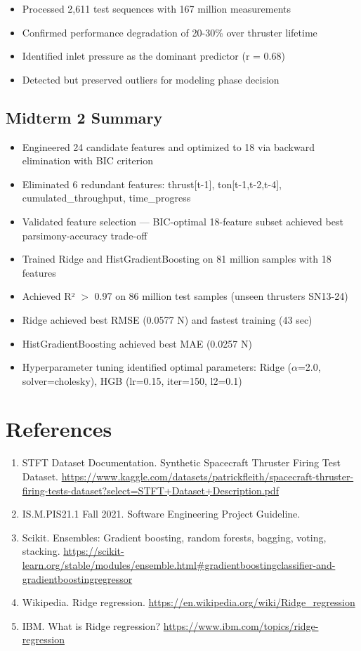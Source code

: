 \documentclass[12pt,a4paper]{article}
\begin{document}
\begin{itemize}
    \item Processed 2,611 test sequences with 167 million measurements
    \item Confirmed performance degradation of 20-30\% over thruster lifetime
    \item Identified inlet pressure as the dominant predictor (r = 0.68)
    \item Detected but preserved outliers for modeling phase decision
\end{itemize}

\subsection{Midterm 2 Summary}

\begin{itemize}
    \item Engineered 24 candidate features and optimized to 18 via backward elimination with BIC criterion
    \item Eliminated 6 redundant features: thrust[t-1], ton[t-1,t-2,t-4], cumulated\_throughput, time\_progress
    \item Validated feature selection — BIC-optimal 18-feature subset achieved best parsimony-accuracy trade-off
    \item Trained Ridge and HistGradientBoosting on 81 million samples with 18 features
    \item Achieved R² $>$ 0.97 on 86 million test samples (unseen thrusters SN13-24)
    \item Ridge achieved best RMSE (0.0577 N) and fastest training (43 sec)
    \item HistGradientBoosting achieved best MAE (0.0257 N)
    \item Hyperparameter tuning identified optimal parameters: Ridge ($\alpha$=2.0, solver=cholesky), HGB (lr=0.15, iter=150, l2=0.1)
\end{itemize}

\newpage
\section*{References}

\begin{enumerate}
    \item STFT Dataset Documentation. Synthetic Spacecraft Thruster Firing Test Dataset.
    \url{https://www.kaggle.com/datasets/patrickfleith/spacecraft-thruster-firing-tests-dataset?select=STFT+Dataset+Description.pdf}
    \item IS.M.PIS21.1 Fall 2021. Software Engineering Project Guideline.
    \item Scikit. Ensembles: Gradient boosting, random forests, bagging, voting, stacking.
    \url{https://scikit-learn.org/stable/modules/ensemble.html#gradientboostingclassifier-and-gradientboostingregressor}
    \item Wikipedia. Ridge regression.
    \url{https://en.wikipedia.org/wiki/Ridge_regression}
    \item IBM. What is Ridge regression?
    \url{https://www.ibm.com/topics/ridge-regression}
\end{enumerate}
\end{document}
